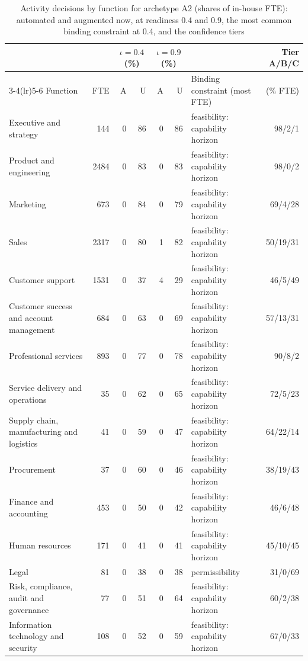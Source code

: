 \begin{table}[t]
\centering
\caption{Activity decisions by function for archetype A2 (shares of in-house FTE): automated and augmented now, at readiness 0.4 and 0.9, the most common binding constraint at 0.4, and the confidence tiers}\label{tab:playbook-functions}
\scriptsize
\setlength{\tabcolsep}{3pt}
\begin{tabular}{@{}lrrrrrp{4.2cm}r@{}}
\toprule
 & & \multicolumn{2}{c}{$\iota=0.4$ (\%)} & \multicolumn{2}{c}{$\iota=0.9$ (\%)} & & Tier A/B/C\\
\cmidrule(lr){3-4}\cmidrule(lr){5-6}
Function & FTE & A & U & A & U & Binding constraint (most FTE) & (\% FTE)\\
\midrule
Executive and strategy & 144 & 0 & 86 & 0 & 86 & feasibility: capability horizon & 98/2/1 \\
Product and engineering & 2484 & 0 & 83 & 0 & 83 & feasibility: capability horizon & 98/0/2 \\
Marketing & 673 & 0 & 84 & 0 & 79 & feasibility: capability horizon & 69/4/28 \\
Sales & 2317 & 0 & 80 & 1 & 82 & feasibility: capability horizon & 50/19/31 \\
Customer support & 1531 & 0 & 37 & 4 & 29 & feasibility: capability horizon & 46/5/49 \\
Customer success and account management & 684 & 0 & 63 & 0 & 69 & feasibility: capability horizon & 57/13/31 \\
Professional services & 893 & 0 & 77 & 0 & 78 & feasibility: capability horizon & 90/8/2 \\
Service delivery and operations & 35 & 0 & 62 & 0 & 65 & feasibility: capability horizon & 72/5/23 \\
Supply chain, manufacturing and logistics & 41 & 0 & 59 & 0 & 47 & feasibility: capability horizon & 64/22/14 \\
Procurement & 37 & 0 & 60 & 0 & 46 & feasibility: capability horizon & 38/19/43 \\
Finance and accounting & 453 & 0 & 50 & 0 & 42 & feasibility: capability horizon & 46/6/48 \\
Human resources & 171 & 0 & 41 & 0 & 41 & feasibility: capability horizon & 45/10/45 \\
Legal & 81 & 0 & 38 & 0 & 38 & permissibility & 31/0/69 \\
Risk, compliance, audit and governance & 77 & 0 & 51 & 0 & 64 & feasibility: capability horizon & 60/2/38 \\
Information technology and security & 108 & 0 & 52 & 0 & 59 & feasibility: capability horizon & 67/0/33 \\

\end{tabular}
\end{table}
